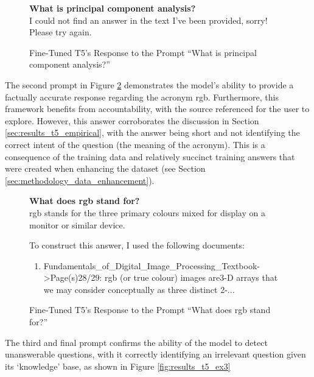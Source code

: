 \begin{figure}[ht!]
    \begin{itquote}
        \textbf{What is principal component analysis?} \\
        I could not find an answer in the text I've been provided, sorry! Please try again.
    \end{itquote}
    \caption{Fine-Tuned T5's Response to the Prompt ``What is principal component analysis?''}
    \label{fig:results_t5_ex1}
\end{figure}

The second prompt in Figure \ref{fig:results_t5_ex2} demonstrates the model's ability to provide a factually accurate response regarding the acronym \acrshort{rgb}. Furthermore, this framework benefits from accountability, with the source referenced for the user to explore. However, this answer corroborates the discussion in Section \ref{sec:results_t5_empirical}, with the answer being short and not identifying the correct intent of the question (the meaning of the acronym). This is a consequence of the training data and relatively succinct training answers that were created when enhancing the dataset (see Section \ref{sec:methodology_data_enhancement}).

\begin{figure}[ht!]
    \begin{itquote}
        \textbf{What does \acrshort{rgb} stand for?} \\ 
        \acrshort{rgb} stands for the three primary colours mixed for display on a monitor or similar device.

        To construct this answer, I used the following documents:
        \begin{enumerate}
            \item Fundamentals\_of\_Digital\_Image\_Processing\_Textbook->Page(s)28/29:  \acrshort{rgb} (or true colour) images are3-D arrays that we may consider conceptually as three  distinct 2-...
        \end{enumerate}
    \end{itquote}
    \caption{Fine-Tuned T5's Response to the Prompt ``What does \acrshort{rgb} stand for?''}
    \label{fig:results_t5_ex2}
\end{figure}

The third and final prompt confirms the ability of the model to detect unanswerable questions, with it correctly identifying an irrelevant question given its `knowledge' base, as shown in Figure \ref{fig:results_t5_ex3}

